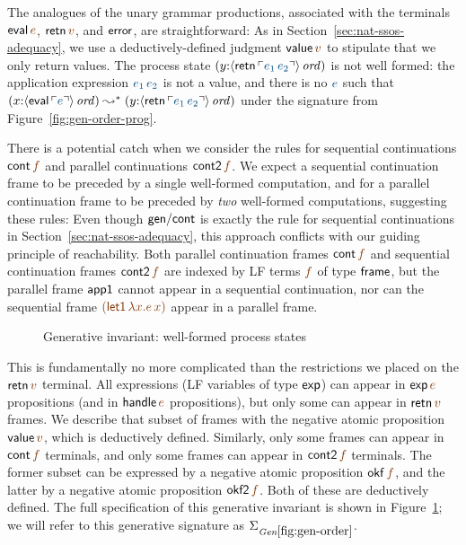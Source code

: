 The analogues of the unary grammar productions, associated with the
terminals ${\sf eval}\,\lf{e}$, ${\sf retn}\,\lf{v}$, and ${\sf
  error}$, are straightforward:
%
\smallskip
{}
\smallskip 
%
As in Section~\ref{sec:nat-ssos-adequacy}, we use a
deductively-defined judgment ${\sf value}\,\lf{v}$ to stipulate that
we only return values. The process state $(y{:}\istrue{\susp{{\sf
      retn}\,\interp{e_1\,e_2}}})$ is not well formed: the
application expression $\obj{e_1\,e_2}$ is not a value, and
there is no $\obj{e}$ such that $(x{:}\istrue{\susp{{\sf
      eval}\,\interp{e}}}) \leadsto^* (y{:}\istrue{\susp{{\sf
      retn}\,\interp{e_1\,e_2}}})$ under the signature from
Figure~\ref{fig:gen-order-prog}.

There is a potential catch when we consider the rules for sequential
continuations ${\sf cont}\,\lf{f}$ and parallel continuations ${\sf
  cont2}\,\lf{f}$. We expect a sequential continuation frame to be
preceded by a single well-formed computation, and for a parallel
continuation frame to be preceded by {\it two} well-formed
computations, suggesting these rules:
%
\smallskip
{}
\smallskip 
%
Even though ${\sf gen/cont}$ is exactly the rule for sequential
continuations in Section~\ref{sec:nat-ssos-adequacy}, this approach
conflicts with our guiding principle of reachability.  Both parallel
continuation frames ${\sf cont}\,\lf{f}$ and sequential continuation
frames ${\sf cont2}\,\lf{f}$ are indexed by LF terms $\lf{f}$ of type
${\sf frame}$, but the parallel frame ${\sf app1}$ cannot appear in a
sequential continuation, nor can the sequential frame $\lf{({\sf
    let1}\,\lf{\lambda x.e\,x})}$ appear in a parallel frame.

\begin{figure}[tp]
\caption{Generative invariant: well-formed process states}
\label{fig:gen-order} 
\end{figure}

This is fundamentally no more complicated than the restrictions we
placed on the ${\sf retn}\,\lf{v}$ terminal. All expressions (LF
variables of type ${\sf exp}$) can appear in ${\sf exp}\,\lf{e}$
propositions (and in ${\sf handle}\,\lf{e}$ propositions), but only
some can appear in ${\sf retn}\,\lf{v}$ frames. We describe that
subset of frames with the negative atomic proposition ${\sf
  value}\,\lf{v}$, which is deductively defined. Similarly, only some
frames can appear in ${\sf cont}\,\lf{f}$ terminals, and only some
frames can appear in ${\sf cont2}\,\lf{f}$ terminals. The former subset
can be expressed by a negative atomic proposition ${\sf okf}\,\lf{f}$,
and the latter by a negative atomic proposition ${\sf okf2}\,\lf{f}$.
Both of these are deductively defined.  The full specification of this
generative invariant is shown in Figure~\ref{fig:gen-order}; we will
refer to this generative signature as $\siggenorder$.

